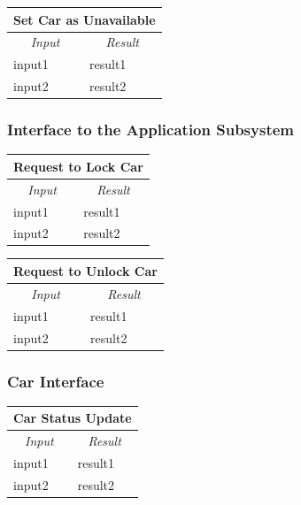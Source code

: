 \documentclass[english]{article}
\begin{document}
\begin{center}
	\begin{tabular}{ | m{6cm} | m{6cm} | }
		\hline 
		\multicolumn{2}{|c|}{\textbf{Set Car as Unavailable}} \\
		\hline
		\multicolumn{1}{|c|}{\textit{Input}} & \multicolumn{1}{c|}{\textit{Result}} \\
		\hline
		input1 & result1 \\
		\hline
		input2 & result2 \\
		\hline
	\end{tabular}
\end{center}

\subsubsection{Interface to the Application Subsystem}
\begin{center}
	\begin{tabular}{ | m{6cm} | m{6cm} | }
		\hline 
		\multicolumn{2}{|c|}{\textbf{Request to Lock Car}} \\
		\hline
		\multicolumn{1}{|c|}{\textit{Input}} & \multicolumn{1}{c|}{\textit{Result}} \\
		\hline
		input1 & result1 \\
		\hline
		input2 & result2 \\
		\hline
	\end{tabular}
\end{center}

\begin{center}
	\begin{tabular}{ | m{6cm} | m{6cm} | }
		\hline 
		\multicolumn{2}{|c|}{\textbf{Request to Unlock Car}} \\
		\hline
		\multicolumn{1}{|c|}{\textit{Input}} & \multicolumn{1}{c|}{\textit{Result}} \\
		\hline
		input1 & result1 \\
		\hline
		input2 & result2 \\
		\hline
	\end{tabular}
\end{center}

\subsubsection{Car Interface}
\begin{center}
	\begin{tabular}{ | m{6cm} | m{6cm} | }
		\hline 
		\multicolumn{2}{|c|}{\textbf{Car Status Update}} \\
		\hline
		\multicolumn{1}{|c|}{\textit{Input}} & \multicolumn{1}{c|}{\textit{Result}} \\
		\hline
		input1 & result1 \\
		\hline
		input2 & result2 \\
		\hline
	\end{tabular}
\end{center}
\end{document}
